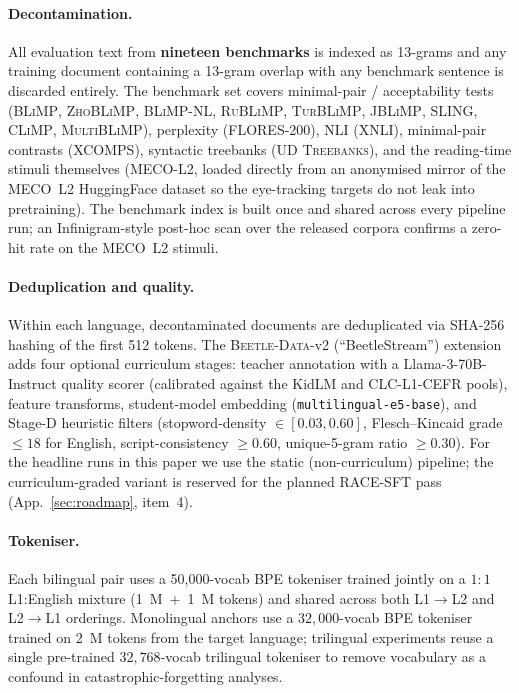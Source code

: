 \paragraph{Decontamination.} All evaluation text from \textbf{nineteen benchmarks} is indexed as 13-grams and any training document containing a 13-gram overlap with any benchmark sentence is discarded entirely. The benchmark set covers minimal-pair / acceptability tests (\textsc{BLiMP}, \textsc{ZhoBLiMP}, \textsc{BLiMP-NL}, \textsc{RuBLiMP}, \textsc{TurBLiMP}, \textsc{JBLiMP}, \textsc{SLING}, \textsc{CLiMP}, \textsc{MultiBLiMP}), perplexity (\textsc{FLORES-200}), NLI (\textsc{XNLI}), minimal-pair contrasts (\textsc{XCOMPS}), syntactic treebanks (\textsc{UD Treebanks}), and the reading-time stimuli themselves (\textsc{MECO-L2}, loaded directly from an anonymised mirror of the MECO~L2 HuggingFace dataset so the eye-tracking targets do not leak into pretraining). The benchmark index is built once and shared across every pipeline run; an Infinigram-style post-hoc scan over the released corpora confirms a zero-hit rate on the MECO~L2 stimuli.

\paragraph{Deduplication and quality.} Within each language, decontaminated documents are deduplicated via SHA-256 hashing of the first 512 tokens. The \textsc{Beetle-Data}-v2 (``BeetleStream'') extension adds four optional curriculum stages: teacher annotation with a Llama-3-70B-Instruct quality scorer (calibrated against the KidLM \citep{nayeem-rafiei-2024-kidlm} and CLC-L1-CEFR pools), feature transforms, student-model embedding (\texttt{multilingual-e5-base}), and Stage-D heuristic filters (stopword-density $\in[0.03, 0.60]$, Flesch--Kincaid grade $\le 18$ for English, script-consistency $\ge 0.60$, unique-5-gram ratio $\ge 0.30$). For the headline runs in this paper we use the static (non-curriculum) pipeline; the curriculum-graded variant is reserved for the planned RACE-SFT pass (App.~\ref{sec:roadmap}, item~4).

\paragraph{Tokeniser.} Each bilingual pair uses a 50,000-vocab BPE tokeniser trained jointly on a $1{:}1$ L1:English mixture (1~M~+~1~M tokens) and shared across both L1$\to$L2 and L2$\to$L1 orderings. Monolingual anchors use a $32{,}000$-vocab BPE tokeniser trained on 2~M tokens from the target language; trilingual experiments reuse a single pre-trained $32{,}768$-vocab trilingual tokeniser to remove vocabulary as a confound in catastrophic-forgetting analyses.


